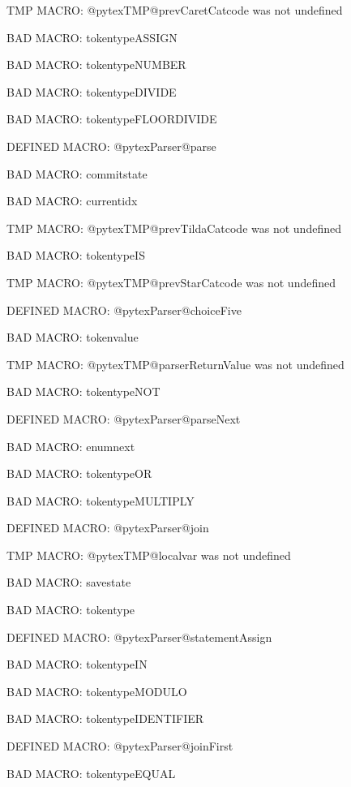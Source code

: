 \ifx\@pytexTMP@prevCaretCatcode\undefined\else TMP MACRO: @pytexTMP@prevCaretCatcode was not undefined
\fi

BAD MACRO: tokentypeASSIGN

BAD MACRO: tokentypeNUMBER

BAD MACRO: tokentypeDIVIDE

BAD MACRO: tokentypeFLOORDIVIDE

\ifx\@pytexParser@parse\undefined\else DEFINED MACRO: @pytexParser@parse
\fi

BAD MACRO: commitstate

BAD MACRO: currentidx

\ifx\@pytexTMP@prevTildaCatcode\undefined\else TMP MACRO: @pytexTMP@prevTildaCatcode was not undefined
\fi

BAD MACRO: tokentypeIS

\ifx\@pytexTMP@prevStarCatcode\undefined\else TMP MACRO: @pytexTMP@prevStarCatcode was not undefined
\fi

\ifx\@pytexParser@choiceFive\undefined\else DEFINED MACRO: @pytexParser@choiceFive
\fi

BAD MACRO: tokenvalue

\ifx\@pytexTMP@parserReturnValue\undefined\else TMP MACRO: @pytexTMP@parserReturnValue was not undefined
\fi

BAD MACRO: tokentypeNOT

\ifx\@pytexParser@parseNext\undefined\else DEFINED MACRO: @pytexParser@parseNext
\fi

BAD MACRO: enumnext

BAD MACRO: tokentypeOR

BAD MACRO: tokentypeMULTIPLY

\ifx\@pytexParser@join\undefined\else DEFINED MACRO: @pytexParser@join
\fi

\ifx\@pytexTMP@localvar\undefined\else TMP MACRO: @pytexTMP@localvar was not undefined
\fi

BAD MACRO: savestate

BAD MACRO: tokentype

\ifx\@pytexParser@statementAssign\undefined\else DEFINED MACRO: @pytexParser@statementAssign
\fi

BAD MACRO: tokentypeIN

BAD MACRO: tokentypeMODULO

BAD MACRO: tokentypeIDENTIFIER

\ifx\@pytexParser@joinFirst\undefined\else DEFINED MACRO: @pytexParser@joinFirst
\fi

BAD MACRO: tokentypeEQUAL

